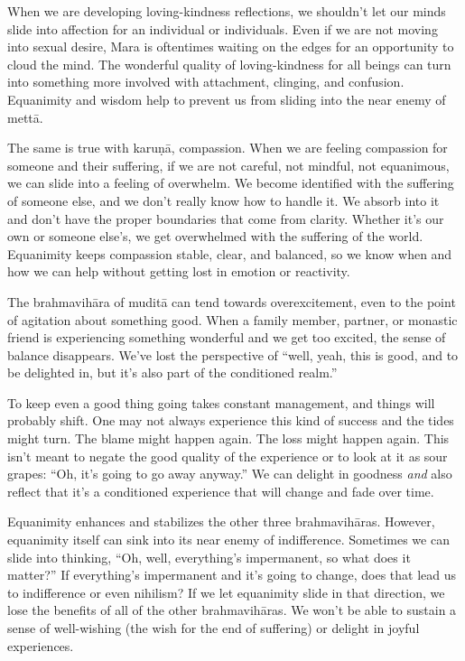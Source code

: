 When we are developing loving-kindness reflections, we shouldn't let our minds slide into affection for an individual or individuals. Even if we are not moving into sexual desire, Mara is oftentimes waiting on the edges for an opportunity to cloud the mind. The wonderful quality of loving-kindness for all beings can turn into something more involved with attachment, clinging, and confusion. Equanimity and wisdom help to prevent us from sliding into the near enemy of mettā.~

The same is true with karuṇā, compassion. When we are feeling compassion for someone and their suffering, if we are not careful, not mindful, not equanimous, we can slide into a feeling of overwhelm. We become identified with the suffering of someone else, and we don't really know how to handle it. We absorb into it and don't have the proper boundaries that come from clarity. Whether it's our own or someone else's, we get overwhelmed with the suffering of the world. Equanimity keeps compassion stable, clear, and balanced, so we know when and how we can help without getting lost in emotion or reactivity.

The brahmavihāra of muditā can tend towards overexcitement, even to the point of agitation about something good. When a family member, partner, or monastic friend is experiencing something wonderful and we get too excited, the sense of balance disappears. We've lost the perspective of ``well, yeah, this is good, and to be delighted in, but it's also part of the conditioned realm.''~

To keep even a good thing going takes constant management, and things will probably shift. One may not always experience this kind of success and the tides might turn. The blame might happen again. The loss might happen again. This isn't meant to negate the good quality of the experience or to look at it as sour grapes: ``Oh, it's going to go away anyway.'' We can delight in goodness \emph{and} also reflect that it's a conditioned experience that will change and fade over time.~

Equanimity enhances and stabilizes the other three brahmavihāras. However, equanimity itself can sink into its near enemy of indifference. Sometimes we can slide into thinking, ``Oh, well, everything's impermanent, so what does it matter?'' If everything's impermanent and it's going to change, does that lead us to indifference or even nihilism? If we let equanimity slide in that direction, we lose the benefits of all of the other brahmavihāras. We won't be able to sustain a sense of well-wishing (the wish for the end of suffering) or delight in joyful experiences.

